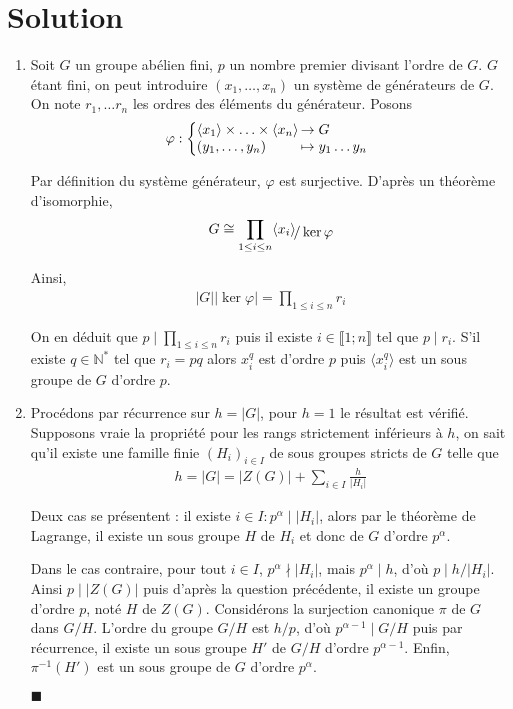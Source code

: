 \documentclass{article}
\newcommand*{\QED}{\hfill\ensuremath{\blacksquare}}%
\begin{document}
\section*{Solution}
\begin{enumerate}
\item Soit $G$ un groupe abélien fini, $p$ un nombre premier divisant l'ordre de $G$. $G$ étant fini, on peut introduire $(x_1,\ldots,x_n)$ un système de générateurs de $G$. On note $r_1,\ldots r_n$ les ordres des éléments du générateur. Posons
\begin{align*}
\varphi : \left\{
     \begin{array}{@{}l@{\thinspace}l}
     \langle x_1\rangle\times\ldots\times\langle x_n\rangle &\to G\\
     (y_1,\ldots,y_n)&\mapsto y_1\ldots y_n
     \end{array}
   \right.   
\end{align*}

Par définition du système générateur, $\varphi$ est surjective. 
D'après un théorème d'isomorphie, 
\begin{align*}
G\cong \prod_{1\leq i\leq n}\langle x_i\rangle \!\raisebox{-.50ex}{\ensuremath{/ \ker \varphi}} \end{align*}

Ainsi, 
\begin{align*}
|G||\ker \varphi| = \prod_{1\leq i\leq n}r_i 
\end{align*}

On en déduit que $p\mid \prod_{1\leq i\leq n} r_i$ puis il existe $i\in \llbracket 1;n\rrbracket$ tel que $p\mid r_i$. S'il existe $q\in \mathbb{N}^*$ tel que $r_i = pq$ alors $x_{i}^q$ est d'ordre $p$ puis $\langle x_i^q\rangle$ est un sous groupe de $G$ d'ordre $p$. 
\item Procédons par récurrence sur $h=|G|$, pour $h=1$ le résultat est vérifié. Supposons vraie la propriété pour les rangs strictement inférieurs à $h$, on sait qu'il existe une famille finie $(H_i)_{i\in I}$ de sous groupes stricts de $G$ telle que
\begin{align*}
h = |G|=|Z(G)|+\sum_{i\in I} \frac{h}{|H_i|}
\end{align*}

Deux cas se présentent : il existe $i\in I : p^{\alpha} \mid |H_i|$, alors par le théorème de Lagrange, il existe un sous groupe $H$ de $H_i$ et donc de $G$ d'ordre $p^{\alpha}$. 

Dans le cas contraire, pour tout $i\in I$, $p^{\alpha} \nmid |H_i|$, mais $p^{\alpha}\mid h$, d'où $p\mid h/|H_i|$. Ainsi $p\mid |Z(G)|$ puis d'après la question précédente, il existe un groupe d'ordre $p$, noté $H$ de $Z(G)$. Considérons la surjection canonique $\pi$ de $G$ dans $G/H$. L'ordre du groupe $G/H$ est $h/p$, d'où $p^{\alpha-1}\mid G/H$ puis par récurrence, il existe un sous groupe $H'$ de $G/H$ d'ordre $p^{\alpha -1}$. Enfin, $\pi^{-1}(H')$ est un sous groupe de $G$ d'ordre $p^{\alpha}$.

\QED
\end{enumerate}
\end{document}
